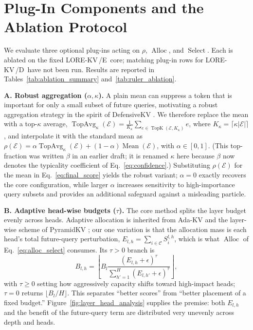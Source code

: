 \documentclass{article} %
\newcommand{\lorekvE}{LORE-KV\,/E}
\newcommand{\lorekvD}{LORE-KV\,/D}
\begin{document}
\section{Plug-In Components and the Ablation Protocol}
\label{sec:ablation_components}

We evaluate three optional plug-ins acting on $\rho$,
$\operatorname{Alloc}$, and $\operatorname{Select}$. Each is ablated
on the fixed \lorekvE\ core; matching plug-in rows for \lorekvD\
have not been run. Results are reported in
Tables~\ref{tab:ablation_summary} and~\ref{tab:ruler_ablation}.

\textbf{A. Robust aggregation ($\alpha,\kappa$).}
\label{subsec:robust_aggregation}
A plain mean can suppress a token that is important for only a small subset of future queries, motivating a robust aggregation strategy in the spirit of DefensiveKV \citep{feng2025taming}. We therefore replace the mean with a top-$\kappa$ average, $\operatorname{TopAvg}_\kappa(\mathcal{E})=\frac{1}{K_\kappa}\sum_{e\in\operatorname{TopK}(\mathcal{E},K_\kappa)} e$, where $K_\kappa=\lceil \kappa|\mathcal{E}|\rceil$, and interpolate it with the standard mean as $\rho(\mathcal{E})=\alpha\operatorname{TopAvg}_\kappa(\mathcal{E})+(1-\alpha)\operatorname{Mean}(\mathcal{E})$, with $\alpha\in[0,1]$. (This top-fraction was written $\beta$ in an earlier draft; it is renamed $\kappa$ here because $\beta$ now denotes the typicality coefficient of Eq.~\ref{eq:confidence}.) Substituting $\rho(\mathcal{E})$ for the mean in Eq.~\ref{eq:final_score} yields the robust variant; $\alpha=0$ exactly recovers the core configuration, while larger $\alpha$ increases sensitivity to high-importance query subsets and provides an additional safeguard against a misleading particle.

\textbf{B. Adaptive head-wise budgets ($\tau$).}
\label{subsec:adaptive_budget}
The core method splits the layer budget evenly across heads. Adaptive allocation is inherited from Ada-KV \citep{feng2024adakv} and the layer-wise scheme of PyramidKV \citep{cai2024pyramidkv}; our one variation is that the allocation mass is each head's total future-query perturbation, $E_{l,h}=\sum_{i\in\mathcal{C}}S^{l,h}_{i}$, which is what $\operatorname{Alloc}$ of Eq.~\ref{eq:alloc_select} consumes. Its $\tau>0$ branch is
\begin{equation}
B_{l,h}=\left\lfloor
B_l\frac{(E_{l,h}+\epsilon)^{\tau}}{\sum_{h'=1}^{H}(E_{l,h'}+\epsilon)^{\tau}}
\right\rfloor,
\label{eq:adaptive_budget}
\end{equation}
with $\tau\ge0$ setting how aggressively capacity shifts toward high-impact heads; $\tau=0$ returns $\lfloor B_l/H\rfloor$. This separates ``better scores'' from ``better placement of a fixed budget.'' Figure~\ref{fig:layer_head_analysis} supplies the premise: both $E_{l,h}$ and the benefit of the future-query term are distributed very unevenly across depth and heads.
\end{document}
